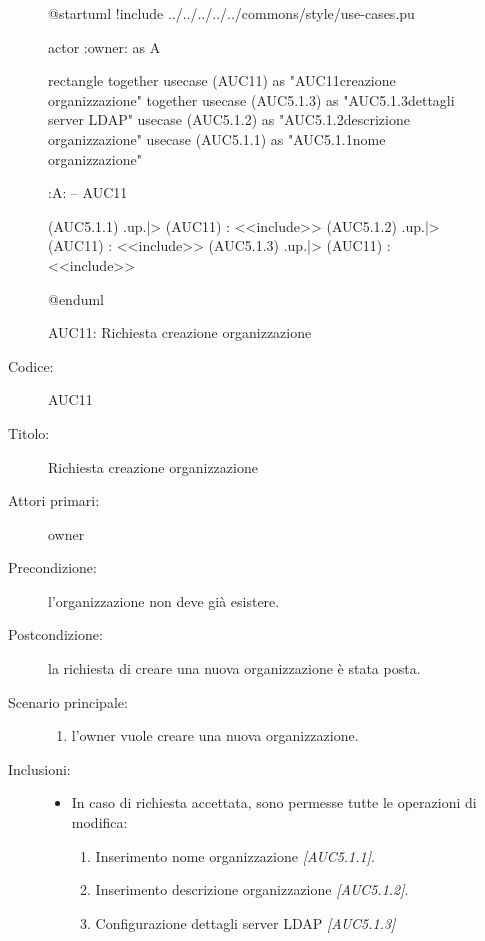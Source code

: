 \documentclass[../../../analisi-dei-requisiti.tex]{subfiles}
\begin{document}
\begin{figure}[H]
  \centering
  \begin{plantuml}
  @startuml
  !include ../../../../../commons/style/use-cases.pu

  actor :owner: as A

  rectangle {
    together {
      usecase (AUC11) as "AUC11\nRichiesta creazione organizzazione"
    }
    together {
      usecase (AUC5.1.3) as "AUC5.1.3\nConfigurazione dettagli server LDAP"
      usecase (AUC5.1.2) as "AUC5.1.2\nInserisci descrizione organizzazione"
      usecase (AUC5.1.1) as "AUC5.1.1\nInserisci nome organizzazione"
    }
  }

  :A: -- AUC11

  (AUC5.1.1) .up.|> (AUC11) : <<include>>
  (AUC5.1.2) .up.|> (AUC11) : <<include>>
  (AUC5.1.3) .up.|> (AUC11) : <<include>>

  @enduml
  \end{plantuml}
  \caption{AUC11: Richiesta creazione organizzazione}
  \label{fig:auc11}
\end{figure}

\begin{description}
  \item[Codice:] AUC11
  \item[Titolo:] Richiesta creazione organizzazione
  \item[Attori primari:] owner
  \item[Precondizione:] l'organizzazione non deve già esistere.
  \item[Postcondizione:] la richiesta di creare una nuova organizzazione è stata posta.
  \item[Scenario principale:]
  \begin{enumerate}
    \item l'owner vuole creare una nuova organizzazione.
  \end{enumerate}
  \item[Inclusioni:]
  \begin{itemize}
    \item In caso di richiesta accettata, sono permesse tutte le operazioni di modifica:
    \begin{enumerate}
      \item Inserimento nome organizzazione \emph{[AUC5.1.1]}.
      \item Inserimento descrizione organizzazione \emph{[AUC5.1.2]}.
      \item Configurazione dettagli server LDAP \emph{[AUC5.1.3]}
    \end{enumerate}
  \end{itemize}
\end{description}
\end{document}
